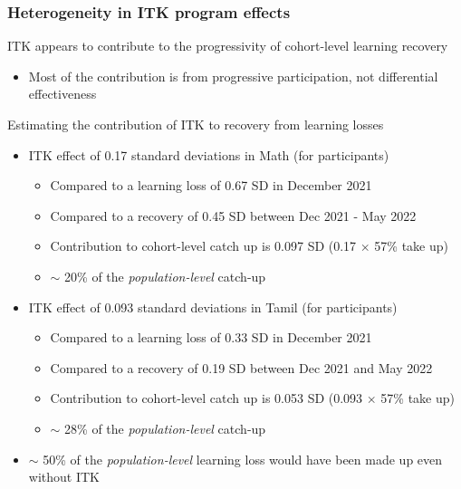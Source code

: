 \documentclass[aspectratio=169,numbering=none]{beamer}
\begin{document}
\subsubsection{Heterogeneity in ITK program effects}

\begin{frame}[plain]{ITK appears to contribute to the progressivity of cohort-level learning recovery}
\centering
{}
\begin{itemize}
    \item Most of the contribution is from progressive participation, not differential effectiveness
\end{itemize}
\end{frame}


\begin{frame}[plain]{Estimating the contribution of ITK to recovery from learning losses}
\begin{itemize}
\vfill \item ITK effect of 0.17 standard deviations in Math (for participants)
\begin{itemize}
\vfill \item Compared to a learning loss of 0.67 SD in December 2021
\vfill \item Compared to a recovery of 0.45 SD between Dec 2021 - May 2022
\vfill \item Contribution to cohort-level catch up is 0.097 SD (0.17 $\times$ 57\% take up)
\vfill \item $\sim$ 20\% of the \textit{population-level} catch-up 
\end{itemize}
\vfill \item ITK effect of 0.093  standard deviations in Tamil (for participants)
\begin{itemize}
    \vfill \item Compared to a learning loss of 0.33 SD in December 2021
    \vfill \item Compared to a recovery of  0.19 SD between Dec 2021 and May 2022
    \vfill \item Contribution to cohort-level catch up is 0.053 SD (0.093 $\times$ 57\% take up)
    \vfill \item $\sim$ 28\% of the \textit{population-level} catch-up 
\end{itemize}
\vfill \item $\sim$ 50\% of the \textit{population-level} learning loss would have been made up even without ITK
\end{itemize}
\end{frame}
\end{document}
